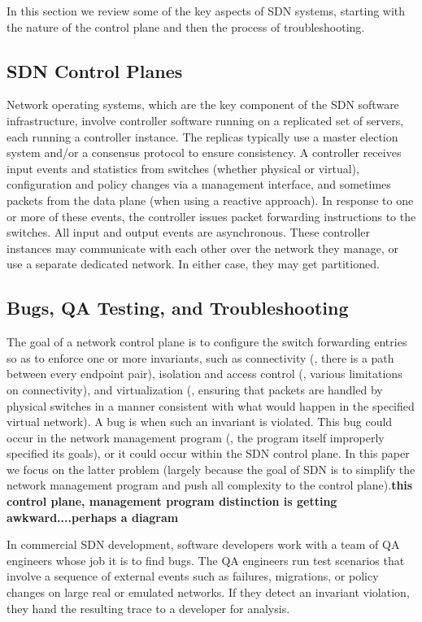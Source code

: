 In this section we review some of the key aspects of SDN systems, starting with the nature of the control plane and then the process of troubleshooting.

\subsection{SDN Control Planes}
Network operating systems, which are the key component of the SDN software infrastructure, involve controller software running on a replicated set of servers, each running a controller instance.  The replicas typically use a master election system and/or a consensus protocol to ensure consistency. A controller receives input events and statistics from switches (whether physical or virtual), configuration and policy changes via a management interface, and sometimes packets from the data plane (when using a reactive approach). In response to one or more of these events, the controller issues packet forwarding instructions to the switches.  All input and output events are asynchronous. These controller instances may communicate with each other over the network they manage, or use a separate dedicated network.  In either case, they may get partitioned.

\subsection{Bugs, QA Testing, and Troubleshooting}
The goal of a network control plane is to configure the switch forwarding entries so as to
enforce one or more invariants, such as connectivity (\ie, there is a path between every
    endpoint pair), isolation and access control (\ie, various limitations on
      connectivity), and virtualization (\ie, ensuring that packets are handled by physical
        switches in a manner consistent with what would happen in the specified virtual
        network). A bug is when such an invariant is violated. This bug could occur in the
      network management program (\ie, the program itself improperly specified its goals), or it could occur within the SDN control plane. In this paper we focus on the latter problem (largely because the goal of SDN is to simplify the network management program and push all complexity to the control plane).{\bf this control plane, management program distinction is getting awkward....perhaps a diagram}

In commercial SDN development, software developers work with a team of QA engineers whose
job it is to find bugs.  The QA engineers run test scenarios that involve a sequence of external events such as failures, migrations, or policy changes on large real or emulated networks.  If they detect an invariant violation, they hand the resulting trace to a developer for analysis. 

